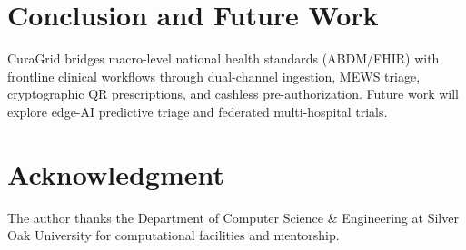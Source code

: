 \documentclass[conference]{IEEEtran}
\begin{document}
\section{Conclusion and Future Work}
CuraGrid bridges macro-level national health standards (ABDM/FHIR) with frontline clinical workflows through dual-channel ingestion, MEWS triage, cryptographic QR prescriptions, and cashless pre-authorization. Future work will explore edge-AI predictive triage and federated multi-hospital trials.

\section*{Acknowledgment}
The author thanks the Department of Computer Science \& Engineering at Silver Oak University for computational facilities and mentorship.
\end{document}
